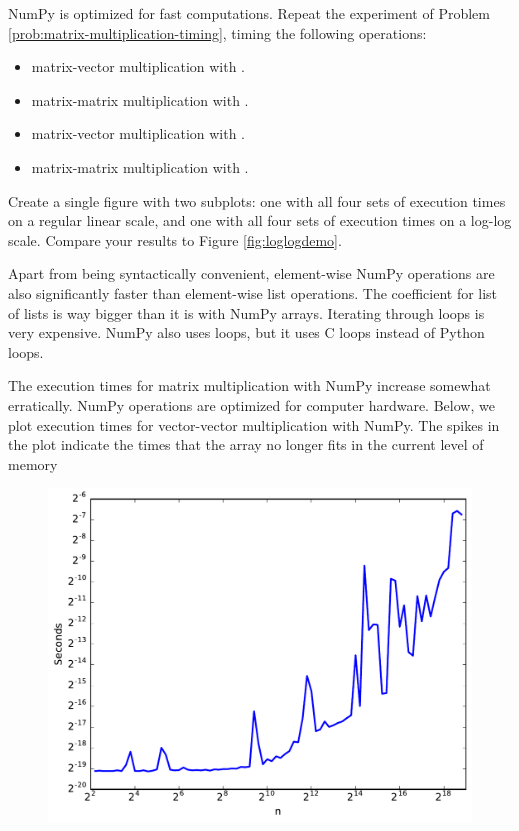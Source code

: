 \begin{problem} %
NumPy is optimized for fast computations.
Repeat the experiment of Problem \ref{prob:matrix-multiplication-timing}, timing the following operations:
%
\begin{itemize}
\item matrix-vector multiplication with .
\item matrix-matrix multiplication with .
\item matrix-vector multiplication with .
\item matrix-matrix multiplication with .
\end{itemize}

Create a single figure with two subplots: one with all four sets of execution times on a regular linear scale, and one with all four sets of execution times on a log-log scale.
Compare your results to Figure \ref{fig:loglogdemo}.
\end{problem}

Apart from being syntactically convenient, element-wise NumPy operations are also significantly faster than element-wise list operations.
The coefficient for list of lists is way bigger than it is with NumPy arrays.
Iterating through loops is very expensive.
NumPy also uses loops, but it uses C loops instead of Python loops.

\begin{info} %
The execution times for matrix multiplication with NumPy increase somewhat erratically.
NumPy operations are optimized for computer hardware.
Below, we plot execution times for vector-vector multiplication with NumPy.
The spikes in the plot indicate the times that the array no longer fits in the current level of memory
%
\begin{figure}[H]
\includegraphics[width=.5\textwidth]{cachingDemo.pdf}
\end{figure}
\end{info}

